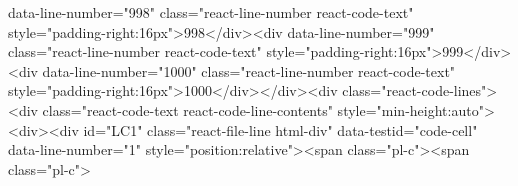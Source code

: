 data-line-number="998" class="react-line-number react-code-text" style="padding-right:16px">998</div><div data-line-number="999" class="react-line-number react-code-text" style="padding-right:16px">999</div><div data-line-number="1000" class="react-line-number react-code-text" style="padding-right:16px">1000</div></div><div class="react-code-lines"><div class="react-code-text react-code-line-contents" style="min-height:auto"><div><div id="LC1" class="react-file-line html-div" data-testid="code-cell" data-line-number="1" style="position:relative"><span class="pl-c"><span class="pl-c">%